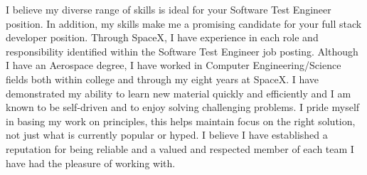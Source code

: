 \documentclass[11pt, a4paper]{awesome-cv} %
\begin{document}
\begin{cvletter}
I believe my diverse range of skills is ideal for your Software Test
Engineer position. In addition, my skills make me a promising
candidate for your full stack developer position. Through SpaceX, I
have experience in each role and responsibility identified within the
Software Test Engineer job posting. Although I have an Aerospace
degree, I have worked in Computer Engineering/Science fields both
within college and through my eight years at SpaceX. I have
demonstrated my ability to learn new material quickly and efficiently
and I am known to be self-driven and to enjoy solving challenging
problems. I pride myself in basing my work on principles, this helps
maintain focus on the right solution, not just what is currently
popular or hyped. I believe I have established a reputation for being
reliable and a valued and respected member of each team I have had the
pleasure of working with.


\end{cvletter}


\makeletterclosing %
\end{document}
